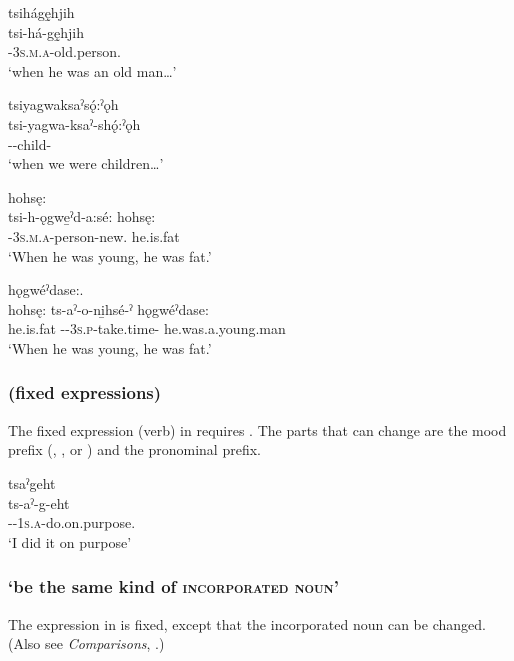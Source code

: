 \ex tsihágę̱hjih\\
\gll tsi-há-gę̱hjih\\
{\coincident}-\textsc{3s.m.a}-old.person.{\stative}\\
\glt `when he was an old man…'

\ex tsiyagwaksaˀsǫ́:ˀǫh\\
\gll tsi-yagwa-ksaˀ-shǫ́:ˀǫh\\
{\coincident}--child-{\pluralizer}\\
\glt `when we were children…'

\ex {} hohsę:\\
tsi-h-ǫgwe̱ˀd-a:sé: hohsę:\\
{\coincident}-\textsc{3s.m.a}-person-new.{\stative} he.is.fat\\
\glt `When he was young, he was fat.'

\ex {} hǫgwéˀdase:.  \\
hohsę: ts-aˀ-o-ni̱hsé-ˀ hǫgwéˀdase:\\
he.is.fat {\coincident}-{\factual}-\textsc{3s.p}-take.time-{\punctual} he.was.a.young.man\\
\glt ‘When he was young, he was fat.’
\z
\z


\subsubsection*{ (fixed expressions)} \label{[tsi-verb]}
The fixed expression (verb) in  requires . The parts that can change are the mood prefix ({\factual}, {\indefinite}, or {\future}) and the pronominal prefix. 

\newpage
\ea\label{ex:tsireq} tsaˀgeht\\
\gll ts-aˀ-g-eht\\
{\coincident}-{\factual}-\textsc{1s.a}-do.on.\-purpose.{\zeropunctual}\\
\glt ‘I did it on purpose’
\z


\subsubsection*{ ‘be the same kind of \textsc{incorporated noun}’}  \label{[tsi-incorporated noun-verb]}
The expression in  is fixed, except that the incorporated noun can be changed. (Also see \textit{Comparisons}, .)


